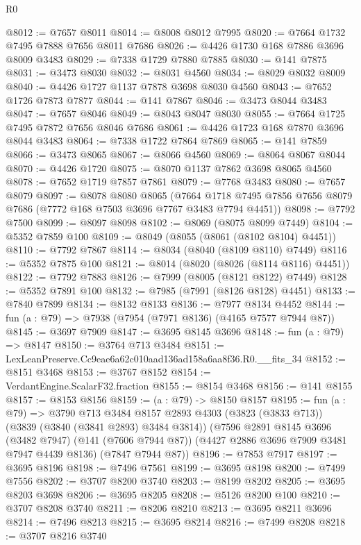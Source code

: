 \begin{lexlean}{R0}
\begin{coremodule}
@8012 := @7657 @8011
@8014 := @8008 @8012 @7995
@8020 := @7664 @1732 @7495 @7888 @7656 @8011 @7686
@8026 := @4426 @1730 @168 @7886 @3696 @8009 @3483
@8029 := @7338 @1729 @7880 @7885
@8030 := @141 @7875
@8031 := @3473 @8030
@8032 := @8031 @4560
@8034 := @8029 @8032 @8009
@8040 := @4426 @1727 @1137 @7878 @3698 @8030 @4560
@8043 := @7652 @1726 @7873 @7877
@8044 := @141 @7867
@8046 := @3473 @8044 @3483
@8047 := @7657 @8046
@8049 := @8043 @8047 @8030
@8055 := @7664 @1725 @7495 @7872 @7656 @8046 @7686
@8061 := @4426 @1723 @168 @7870 @3696 @8044 @3483
@8064 := @7338 @1722 @7864 @7869
@8065 := @141 @7859
@8066 := @3473 @8065
@8067 := @8066 @4560
@8069 := @8064 @8067 @8044
@8070 := @4426 @1720
@8075 := @8070 @1137 @7862 @3698 @8065 @4560
@8078 := @7652 @1719 @7857 @7861
@8079 := @7768 @3483
@8080 := @7657 @8079
@8097 := @8078
    @8080
    @8065
    (@7664 @1718 @7495 @7856 @7656 @8079 @7686 (@7772 @168 @7503 @3696 @7767 @3483 @7794 @4451))
@8098 := @7792 @7500
@8099 := @8097 @8098
@8102 := @8069 (@8075 @8099 @7449)
@8104 := @5352 @7859 @100
@8109 := @8049 (@8055 (@8061 (@8102 @8104) @4451))
@8110 := @7792 @7867
@8114 := @8034 (@8040 (@8109 @8110) @7449)
@8116 := @5352 @7875 @100
@8121 := @8014 (@8020 (@8026 (@8114 @8116) @4451))
@8122 := @7792 @7883
@8126 := @7999 (@8005 (@8121 @8122) @7449)
@8128 := @5352 @7891 @100
@8132 := @7985 (@7991 (@8126 @8128) @4451)
@8133 := @7840 @7899
@8134 := @8132 @8133
@8136 := @7977 @8134 @4452
@8144 := fun (a : @79) => @7938 (@7954 (@7971 @8136) (@4165 @7577 @7944 @87))
@8145 := @3697 @7909
@8147 := @3695 @8145 @3696
@8148 := fun (a : @79) => @8147
@8150 := @3764 @713 @3484
@8151 := LexLeanPreserve.Cc9eae6a62c010aad136ad158a6aa8f36.R0.__fits_34
@8152 := @8151 @3468
@8153 := @3767 @8152
@8154 := VerdantEngine.ScalarF32.fraction
@8155 := @8154 @3468
@8156 := @141 @8155
@8157 := @8153 @8156
@8159 := (a : @79) -> @8150 @8157
@8195 := fun (a : @79) =>
  @3790
    @713
    @3484
    @8157
    @2893
    @4303
    (@3823 (@3833 @713))
    (@3839 (@3840 (@3841 @2893) @3484 @3814))
    (@7596
      @2891
      @8145
      @3696
      (@3482 @7947)
      (@141 (@7606 @7944 @87))
      (@4427 @2886 @3696 @7909 @3481 @7947 @4439 @8136)
      (@7847 @7944 @87))
@8196 := @7853 @7917
@8197 := @3695 @8196
@8198 := @7496 @7561
@8199 := @3695 @8198
@8200 := @7499 @7556
@8202 := @3707 @8200 @3740
@8203 := @8199 @8202
@8205 := @3695 @8203 @3698
@8206 := @3695 @8205
@8208 := @5126 @8200 @100
@8210 := @3707 @8208 @3740
@8211 := @8206 @8210
@8213 := @3695 @8211 @3696
@8214 := @7496 @8213
@8215 := @3695 @8214
@8216 := @7499 @8208
@8218 := @3707 @8216 @3740

\end{coremodule}
\end{lexlean}

